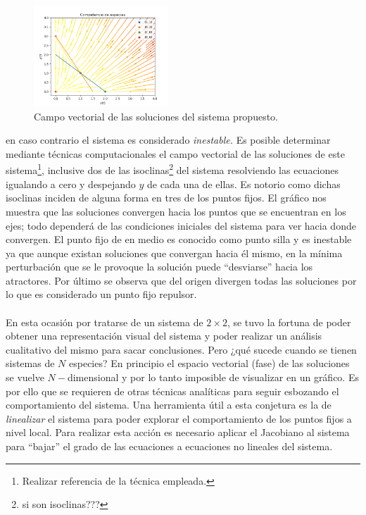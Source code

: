 \documentclass[11pt,a4paper]{article}
\begin{document}
\begin{figure} \vspace{-30pt} \begin{center}
		\includegraphics[width=0.45\textwidth]{Competencia de especies} 
		\end{center} 
		\vspace{-20pt} 
		\caption{Campo vectorial de las soluciones del sistema propuesto.} 
		\vspace{-10pt}
		\label{fig:CompetenciaEspecies}
\end{figure} 
en caso contrario el sistema es considerado \textit{inestable.} Es posible determinar mediante técnicas computacionales el campo vectorial de las soluciones de este sistema\footnote{Realizar referencia de la técnica empleada.}, inclusive dos de las isoclinas\footnote{si son isoclinas???} del sistema resolviendo las ecuaciones igualando a cero y despejando $y$ de cada una de ellas. Es notorio como dichas isoclinas inciden de alguna forma en tres de los puntos fijos. El gráfico nos muestra que las soluciones convergen hacia los puntos que se encuentran en los ejes; todo dependerá de las condiciones iniciales del sistema para ver hacia donde convergen. El punto fijo de en medio es conocido como punto silla y es inestable ya que aunque existan soluciones que convergan hacia él mismo, en la mínima perturbación que se le provoque la solución puede ``desviarse'' hacia los atractores. Por último se observa que del origen divergen todas las soluciones por lo que es considerado un punto fijo repulsor.\\
\\
En esta ocasión por tratarse de un sistema de $2\times 2$, se tuvo la fortuna de poder obtener una representación visual del sistema y poder realizar un análisis cualitativo del mismo para sacar conclusiones. Pero ¿qué sucede cuando se tienen sistemas de $N$ especies? En principio el espacio vectorial (fase) de las soluciones se vuelve $N-$dimensional y por lo tanto imposible de visualizar en un gráfico. Es por ello que se requieren de otras técnicas analíticas para seguir esbozando el comportamiento del sistema. Una herramienta útil a esta conjetura es la de \textit{linealizar} el sistema para poder explorar el comportamiento de los puntos fijos a nivel local. Para realizar esta acción es necesario aplicar el Jacobiano al sistema para ``bajar'' el grado de las ecuaciones a ecuaciones no lineales del sistema.\\
\end{document}
